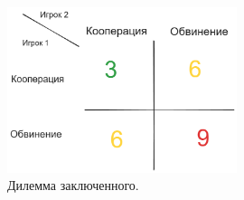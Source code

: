 \begin{figure}[h]
    \centering
    \includegraphics[width=0.6\textwidth]{assets/pedagogic/social/dilemma.excalidraw.png}
    \caption{Дилемма заключенного.}
    \label{dilem}
\end{figure}
